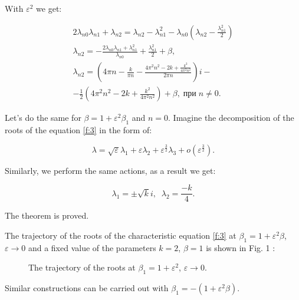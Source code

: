 \documentclass[12pt]{article} %
\newcommand{\eps}{\varepsilon}
\begin{document}
With \(\varepsilon^{2}\) we get:

\begin{equation}
\begin{array}{cc}
2\lambda_{n0}\lambda_{n1}+\lambda_{n2}=
\lambda_{n2}-\lambda_{n1}^{2}-\lambda_{n0}\left(\lambda_{n2}-\displaystyle\frac{\lambda_{n1}^{2}}{2}\right)\\
\lambda_{n2}=-\displaystyle\frac{2\lambda_{n0}\lambda_{n1}+\lambda_{n1}^2}{\lambda_{n0}}+\displaystyle\frac{\lambda_{n1}^2}{2}+\beta,\\
\lambda_{n2}=\left(4\pi n-\displaystyle\frac{k}{\pi n}-\displaystyle\frac{4\pi^2n^2-2k+\displaystyle\frac{k^2}{4\pi^2n^2}}{2\pi n}\right)i-\\
-\displaystyle\frac{1}{2}\left(4\pi^2n^2-2k+\displaystyle\frac{k^2}{4\pi^2n^2}\right)+\beta,\;\text{при}\;n\neq0.
\end{array}
\label{f:8}
\end{equation}


Let's do the same for \(\beta=1+\eps^2\beta_1\) and \(n=0\). Imagine the decomposition of the roots of the equation \eqref{f:3} in the form of:

\[
\lambda= \sqrt{\varepsilon}\lambda_{1}+\varepsilon\lambda_{2}+\varepsilon^{\frac{3}{2}}\lambda_{3}+o(\varepsilon^{\frac{3}{2}}).
\]

\noindent Similarly, we perform the same actions, as a result we get:

\[
\lambda_{1}=\pm \sqrt{ k}i,\;\;\lambda_{2}=\frac{-k}{4}.
\]

The theorem is proved.

The trajectory of the roots of the characteristic equation \eqref{f:3} at $\beta_1=1+\eps^2\beta$, $\eps\to 0$ and a fixed value of the parameters $k=2$, $\beta=1$ is shown in Fig. 1 :

\begin{figure}[h!]
\caption{The trajectory of the roots at $\beta_1=1+\eps^2$, $\eps\to 0$.}%
\label{fig:11}
\end{figure}
Similar constructions can be carried out with \(\beta_1=-(1+\eps^2\beta)\).
\end{document}
